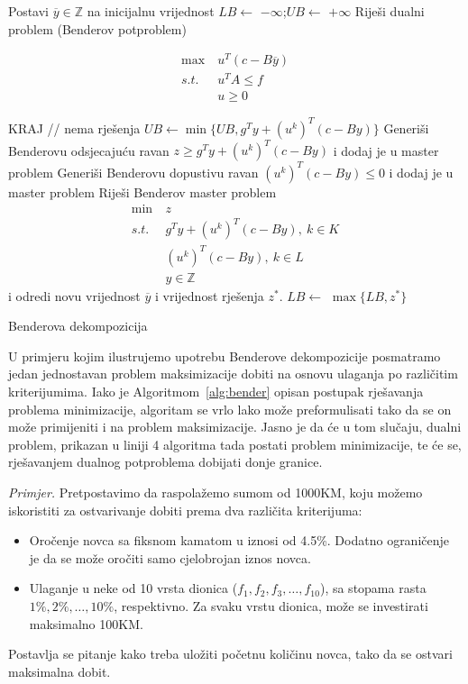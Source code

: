 \documentclass[a4paper, utf8, 11pt, colorlinks]{book}
\begin{document}
 \begin{algorithm}[H] \label{alg:bender}
 	\begin{algorithmic}[1] 
 		\STATE Postavi $\overline{y}\in\mathbb{Z}$ na inicijalnu vrijednost
 		\STATE 	$LB \gets$ $-\infty$;$UB \gets$ $+\infty$
 		\STATE Riješi dualni problem (Benderov potproblem)
 		
 		$$	\begin{aligned}
 			\max\ &u^T (c-B\overline{y})\\
 			s.t.\ &u^TA\leqslant f\\
 			&u\geqslant 0
 			\end{aligned}$$
 		
 		\STATE  KRAJ // nema  rješenja  
 		\ENDIF
 		\STATE $UB \gets \min\{UB,g^Ty+(u^k)^T(c-By)\}$
 		\STATE Generiši Benderovu odsjecajuću ravan $z\geqslant g^Ty+(u^k)^T(c-By)$ i dodaj je u master problem
 		\ENDIF
		\STATE Generiši Benderovu dopustivu ravan 	$(u^k)^T(c-By)\leqslant 0$ i dodaj je u master problem
		\ENDIF
		\STATE Riješi Benderov master problem
			$$\begin{aligned}
			\min\ &z\\
			s.t.\ & g^Ty+(u^k)^T(c-By), \ k \in K\\
			& (u^k)^T(c-By), \ k \in L\\
			&y \in \mathbb{Z}
		\end{aligned}$$
			i odredi novu vrijednost $\overline{y}$ i vrijednost rješenja $z^*$.
		\STATE $LB \gets$ $\max\{LB,z^*\}$
 		\ENDWHILE
 	\end{algorithmic}
 	\caption{Benderova dekompozicija}\label{alg:bender}
 \end{algorithm}



U primjeru kojim ilustrujemo upotrebu Benderove dekompozicije posmatramo jedan jednostavan problem maksimizacije dobiti na osnovu ulaganja po različitim kriterijumima.
Iako je Algoritmom~\ref{alg:bender} opisan postupak rješavanja problema minimizacije, algoritam se vrlo lako može preformulisati tako da se on može primijeniti i na problem maksimizacije. Jasno je da će u tom slučaju, dualni problem, prikazan u liniji 4 algoritma tada postati problem minimizacije, te će se, rješavanjem dualnog potproblema dobijati donje granice.


\emph{Primjer.} Pretpostavimo da raspolažemo sumom od 1000KM, koju možemo iskoristiti za ostvarivanje dobiti prema dva različita kriterijuma:
\begin{itemize}
	\item Oročenje novca sa fiksnom kamatom u iznosi od 4.5\%. Dodatno ograničenje je da se može oročiti samo cjelobrojan iznos novca.
	
	\item Ulaganje u neke od 10 vrsta dionica ($f_1, f_2, f_3,\ldots,f_{10}$), sa stopama rasta $1\%,2\%,\ldots,10\%$, respektivno. Za svaku vrstu dionica, može se investirati maksimalno 100KM.
\end{itemize}
Postavlja se pitanje kako treba uložiti početnu količinu novca, tako da se ostvari maksimalna dobit.
\end{document}
